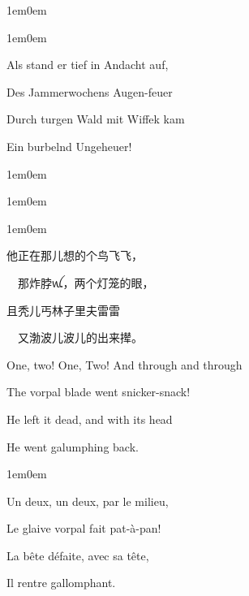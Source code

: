 \documentclass[
  12pt,
  twoside,
  openright,
  oldfontcommands,
]{memoir}
\begin{document}
\hfill\break

\begin{adjustwidth}{1em}{0em}

\begin{adjustwidth}{1em}{0em}

Als stand er tief in Andacht auf,

Des Jammerwochen\textquotesingle s Augen-feuer

Durch turgen Wald mit Wiffek kam

Ein burbelnd Ungeheuer!

\end{adjustwidth}

\end{adjustwidth}

\hfill\break

\begin{adjustwidth}{1em}{0em}

\begin{adjustwidth}{1em}{0em}

\begin{adjustwidth}{1em}{0em}

他正在那儿想的个鸟飞飞，

　那炸脖{\gebfont ꪡ}，两个灯笼的眼，

且秃儿丐林子里夫雷雷

　又渤波儿波儿的出来撵。

\end{adjustwidth}

\end{adjustwidth}

\end{adjustwidth}

\hfill\break

One, two! One, Two! And through and through

The vorpal blade went snicker-snack!

He left it dead, and with its head

He went galumphing back.

\hfill\break

\begin{adjustwidth}{1em}{0em}

Un deux, un deux, par le milieu,

Le glaive vorpal fait pat-à-pan!

La bête défaite, avec sa tête,

Il rentre gallomphant.

\end{adjustwidth}
\end{document}
